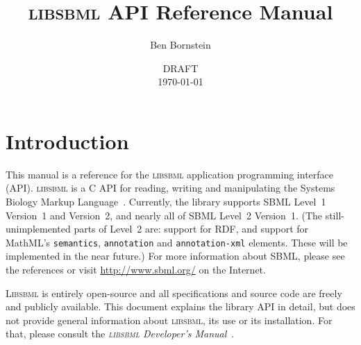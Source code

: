 \documentclass{cekmanual}
\begin{document}

\title{\textsc{libsbml} API Reference Manual}

\author{Ben Bornstein}


\address{Systems Biology Workbench Development Group\\
  ERATO Kitano Symbiotic Systems Project\\
  Control and Dynamical Systems, MC 107-81\\
  California Institute of Technology, Pasadena, CA 91125, USA\\[3pt]
  {\url{http://www.sbml.org/}}}


\date{DRAFT\\[5pt]
  \today{}}

\maketitlepage


\section{Introduction}
\label{sec:quickstart-unix}

This manual is a reference for the \textsc{libsbml} application programming
interface (API).  \textsc{libsbml} is a C API for reading, writing and
manipulating the Systems Biology Markup
Language~\citep[SBML;][]{hucka:2003,finney:2003c}.  Currently, the library
supports SBML Level~1 Version~1 and Version~2, and nearly all of SBML Level~2
Version~1.  (The still-unimplemented parts of Level~2 are: support for RDF,
and support for MathML's \texttt{semantics}, \texttt{annotation} and
\texttt{annotation-xml} elements.  These will be implemented in the near
future.)  For more information about SBML, please see the references
or visit \url{http://www.sbml.org/} on the Internet.

\textsc{Libsbml} is entirely open-source and all specifications and source
code are freely and publicly available.  This document explains the library
API in detail, but does not provide general information about
\textsc{libsbml}, its use or its installation.  For that, please consult
the \emph{\textsc{libsbml} Developer's Manual}~\citep{bornstein:2003}.
\end{document}
